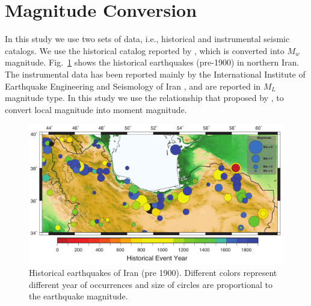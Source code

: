 \section{Magnitude Conversion}

In this study we use two sets of data, i.e., historical and instrumental seismic catalogs. We use the historical catalog reported by \citep{Karimiparidari2013}, which is converted into $M_w$ magnitude. Fig.~\ref{fig:historical} shows the historical earthquakes (pre-1900) in northern Iran. The instrumental data has been reported mainly by the International Institute of Earthquake Engineering and Seismology of Iran \citep{IIEES}, and are reported in $M_L$ magnitude type. In this study we use the relationship that proposed by \citet{Karimiparidari2013}, to convert local magnitude into moment magnitude. 

\begin{figure} [H]
\centering
\includegraphics[scale=0.8]{figures/pdf/Figure2.pdf} 
\caption{Historical earthquakes of Iran (pre 1900). Different colors represent different year of occurrences and size of circles are proportional to the earthquake magnitude. }
\label{fig:historical}
\end{figure}
